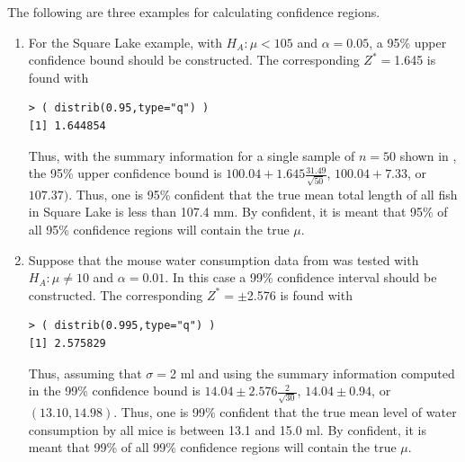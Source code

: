 \documentclass[10pt,openany]{book}\usepackage[]{graphicx}\usepackage[]{color}
\makeatletter
\newenvironment{kframe}{%
 \def\at@end@of@kframe{}%
 \ifinner\ifhmode%
  \def\at@end@of@kframe{\end{minipage}}%
  \begin{minipage}{\columnwidth}%
 \fi\fi%
 \def\FrameCommand##1{\hskip\@totalleftmargin \hskip-\fboxsep
 \colorbox{shadecolor}{##1}\hskip-\fboxsep
     \hskip-\linewidth \hskip-\@totalleftmargin \hskip\columnwidth}%
 \MakeFramed {\advance\hsize-\width
   \@totalleftmargin\z@ \linewidth\hsize
   \@setminipage}}%
 {\par\unskip\endMakeFramed%
 \at@end@of@kframe}
\newenvironment{knitrout}{}{} %
\makeatother
\begin{document}
The following are three examples for calculating confidence regions.
\begin{enumerate}
  \item For the Square Lake example, with $H_{A}:\mu < 105$ and $\alpha=0.05$, a 95\% upper confidence bound should be constructed.  The corresponding $Z^{*}=$1.645 is found with
\begin{knitrout}
\color{fgcolor}\begin{kframe}
\begin{verbatim}
> ( distrib(0.95,type="q") )
[1] 1.644854
\end{verbatim}
\end{kframe}
\end{knitrout}
Thus, with the summary information for a single sample of $n=50$ shown in , the 95\% upper confidence bound is $100.04+1.645\frac{31.49}{\sqrt{50}}$, $100.04+7.33$, or $107.37)$.  Thus, one is 95\% confident that the true mean total length of all fish in Square Lake is less than 107.4 mm.  By confident, it is meant that 95\% of all 95\% confidence regions will contain the true $\mu$.

  \item Suppose that the mouse water consumption data from  was tested with $H_{A}:\mu \neq 10$ and $\alpha=0.01$.  In this case a 99\% confidence interval should be constructed.  The corresponding $Z^{*}=\pm$2.576 is found with
\begin{knitrout}
\color{fgcolor}\begin{kframe}
\begin{verbatim}
> ( distrib(0.995,type="q") )
[1] 2.575829
\end{verbatim}
\end{kframe}
\end{knitrout}
Thus, assuming that $\sigma=$2 ml and using the summary information computed in  the 99\% confidence bound is $14.04\pm2.576\frac{2}{\sqrt{30}}$, $14.04\pm0.94$, or $(13.10,14.98)$.  Thus, one is 99\% confident that the true mean level of water consumption by all mice is between 13.1 and 15.0 ml.  By confident, it is meant that 99\% of all 99\% confidence regions will contain the true $\mu$.


\end{enumerate}
\end{document}
